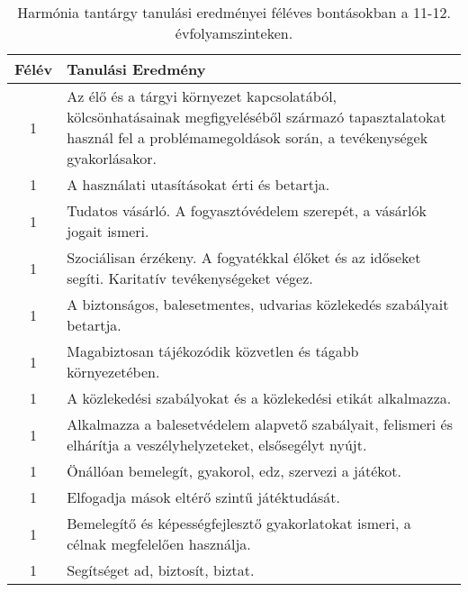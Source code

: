        
           \begin{longtable}{c | p{12cm} }
            \caption[Harmónia 11-12.]{Harmónia tantárgy tanulási eredményei féléves bontásokban a 11-12. évfolyamszinteken. }  \\

            \textbf{Félév} & \textbf{Tanulási Eredmény} \\
            \hline
            \endhead
                                
                                      
                                
                                          1 &  Az élő és a tárgyi környezet kapcsolatából, kölcsönhatásainak megfigyeléséből származó tapasztalatokat használ fel a problémamegoldások során, a tevékenységek gyakorlásakor. \\ \hline
                                          1 &  A használati utasításokat érti és betartja. \\ \hline
                                          1 &  Tudatos vásárló. A fogyasztóvédelem szerepét, a vásárlók jogait ismeri. \\ \hline
                                          1 &  Szociálisan érzékeny. A fogyatékkal élőket és az időseket segíti. Karitatív tevékenységeket végez. \\ \hline
                                          1 &  A biztonságos, balesetmentes, udvarias közlekedés szabályait betartja. \\ \hline
                                          1 &  Magabiztosan tájékozódik közvetlen és tágabb környezetében. \\ \hline
                                          1 &  A közlekedési szabályokat és a közlekedési etikát alkalmazza. \\ \hline
                                          1 &  Alkalmazza a balesetvédelem alapvető szabályait, felismeri és elhárítja a veszélyhelyzeteket, elsősegélyt nyújt. \\ \hline
                                          1 &  Önállóan bemelegít, gyakorol, edz, szervezi a játékot. \\ \hline
                                          1 &  Elfogadja mások eltérő szintű játéktudását. \\ \hline
                                          1 &  Bemelegítő és képességfejlesztő gyakorlatokat ismeri, a célnak megfelelően használja. \\ \hline
                                          1 &  Segítséget ad, biztosít, biztat. \\ \hline

\end{longtable}
